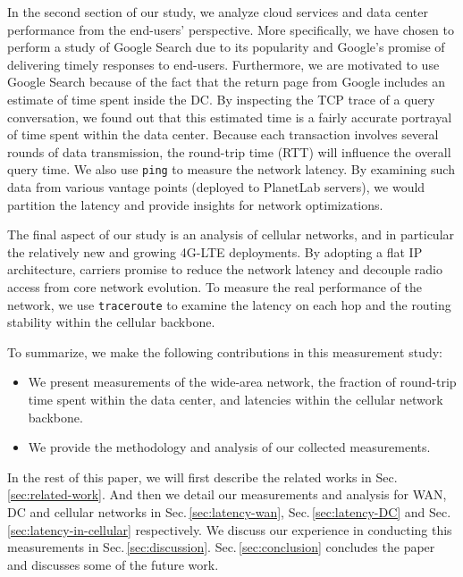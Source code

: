 In the second section of our study, we analyze cloud services and data center performance from the end-users' perspective. More specifically, we have chosen to perform a study of Google Search due to its popularity and Google's promise of delivering timely responses to end-users. Furthermore, we are motivated to use Google Search because of the fact that the return page from Google includes an estimate of time spent inside the DC. By inspecting the TCP trace of a query conversation, we found out that this estimated time is a fairly accurate portrayal of time spent within the data center. Because each transaction involves several rounds of data transmission, the round-trip time (RTT) will influence the overall query time. We also use \texttt{ping} to measure the network latency.
By examining such data from various vantage points (deployed to PlanetLab servers), we would partition the latency and provide insights for network optimizations.

The final aspect of our study is an analysis of cellular networks, and in particular the relatively new and growing 4G-LTE deployments. By adopting a flat IP architecture, carriers promise to reduce the network latency and decouple radio access from core network evolution. To measure the real performance of the network, we use \texttt{traceroute} to examine the latency on each hop and the routing stability within the cellular backbone.

To summarize, we make the following contributions in this measurement study:
\begin{itemize}
\setlength{\itemsep}{1pt}
\setlength{\parskip}{0pt}
\setlength{\parsep}{0pt}
\item We present measurements of the wide-area network, the fraction of round-trip time spent within the data center, and latencies within the cellular network backbone.
\item We provide the methodology and analysis of our collected measurements.
\end{itemize}

In the rest of this paper, we will first describe the related works in Sec.\,\ref{sec:related-work}. And then we detail our measurements and analysis for WAN, DC and cellular networks in Sec.\,\ref{sec:latency-wan}, Sec.\,\ref{sec:latency-DC} and Sec.\,\ref{sec:latency-in-cellular} respectively. We discuss our experience in conducting this measurements in Sec.\,\ref{sec:discussion}. Sec.\,\ref{sec:conclusion} concludes the paper and discusses some of the future work.

